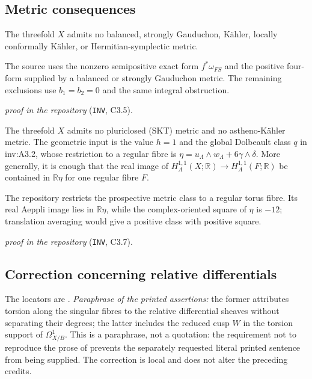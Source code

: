 \subsection{Metric consequences}\label{sec:metric-announcements}

\begin{announcement}\label{inv:C3.5}
The threefold $X$ admits no balanced, strongly Gauduchon, K\"ahler,
locally conformally K\"ahler, or Hermitian-symplectic metric.
\end{announcement}

The source uses the nonzero semipositive exact form $f^*\omega_{FS}$ and the positive four-form supplied by a balanced or strongly Gauduchon metric. The remaining exclusions use $b_1=b_2=0$ and the same integral obstruction.
\par\noindent\emph{proof in the repository} (\texttt{INV}, C3.5).

\begin{announcement}\label{inv:C3.7}
The threefold $X$ admits no pluriclosed (SKT) metric and no
astheno-K\"ahler metric.  The geometric input is the value $h=1$
and the global Dolbeault class $q$ in inv:A3.2, whose restriction to a
regular fibre is $\eta=u_{\Lambda}\wedge w_{\Lambda}+6\gamma\wedge\delta$.
More generally, it is enough that the real image of
$H_A^{1,1}(X;\mathbb R)\to H_A^{1,1}(F;\mathbb R)$ be contained in
$\mathbb R\eta$ for one regular fibre $F$.
\end{announcement}

The repository restricts the prospective metric class to a regular torus fibre. Its real Aeppli image lies in $\mathbb R\eta$, while the complex-oriented square of $\eta$ is $-12$; translation averaging would give a positive class with positive square.
\par\noindent\emph{proof in the repository} (\texttt{INV}, C3.7).

\subsection*{Correction concerning relative differentials}\label{sec:relative-correction}
The locators are \cite[Remark 1.3, printed p.~5; Remark 9.21, printed p.~81]{AC26}.
\emph{Paraphrase of the printed assertions:} the former attributes torsion
along the singular fibres to the relative differential sheaves without
separating their degrees; the latter includes the reduced cusp $W$ in the
torsion support of $\Omega^1_{X/B}$. This is a paraphrase, not a quotation:
the requirement not to reproduce the prose of \cite{AC26} prevents the
separately requested literal printed sentence from being supplied.
The correction is local and does not alter the preceding credits.


